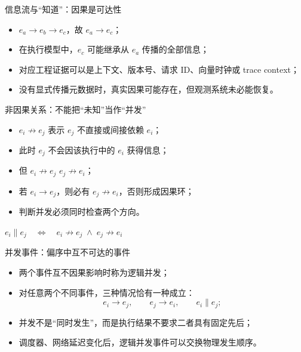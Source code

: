 \documentclass[UTF8,fontset=none,aspectratio=169,10pt]{beamer}
\begin{document}
\begin{frame}{信息流与“知道”：因果是可达性}
\begin{center}
\end{center}
\vfill
\begin{itemize}
  \item $e_a\rightarrow e_b\rightarrow e_c$，故 $e_a\rightarrow e_c$；
  \item 在执行模型中，$e_c$ 可能继承从 $e_a$ 传播的全部信息；
  \item 对应工程证据可以是上下文、版本号、请求 ID、向量时钟或 trace context；
  \item 没有显式传播元数据时，真实因果可能存在，但观测系统未必能恢复。
\end{itemize}
\end{frame}

\begin{frame}{非因果关系：不能把“未知”当作“并发”}
\begin{itemize}
  \item $e_i\not\rightarrow e_j$ 表示 $e_j$ 不直接或间接依赖 $e_i$；
  \item 此时 $e_j$ 不会因该执行中的 $e_i$ 获得信息；
  \item 但 $e_i\not\rightarrow e_j$  $e_j\not\rightarrow e_i$；
  \item 若 $e_i\rightarrow e_j$，则必有 $e_j\not\rightarrow e_i$，否则形成因果环；
  \item 判断并发必须同时检查两个方向。
\end{itemize}
\vfill
\begin{center}\Large
$e_i\parallel e_j\quad\Longleftrightarrow\quad
e_i\not\rightarrow e_j\;\land\;e_j\not\rightarrow e_i$
\end{center}
\end{frame}

\begin{frame}{并发事件：偏序中互不可达的事件}
\begin{itemize}
  \item 两个事件互不因果影响时称为逻辑并发；
  \item 对任意两个不同事件，三种情况恰有一种成立：
  \[
    e_i\rightarrow e_j,\qquad e_j\rightarrow e_i,\qquad e_i\parallel e_j;
  \]
  \item 并发不是“同时发生”，而是执行结果不要求二者具有固定先后；
  \item 调度器、网络延迟变化后，逻辑并发事件可以交换物理发生顺序。
\end{itemize}
\vfill
{}
\end{frame}
\end{document}
